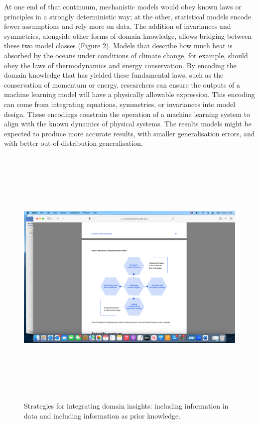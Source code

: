 At one end of that continuum, mechanistic models would obey known laws
or principles in a strongly deterministic way; at the other, statistical
models encode fewer assumptions and rely more on data. The addition of
invariances and symmetries, alongside other forms of domain knowledge,
allows bridging between these two model classes (Figure 2). Models that
describe how much heat is absorbed by the oceans under conditions of
climate change, for example, should obey the laws of thermodynamics and
energy conservation. By encoding the domain knowledge that has yielded
these fundamental laws, such as the conservation of momentum or energy,
researchers can ensure the outputs of a machine learning model will have
a physically allowable expression. This encoding can come from
integrating equations, symmetries, or invariances into model design.
These encodings constrain the operation of a machine learning system to
align with the known dynamics of physical systems. The results models
might be expected to produce more accurate results, with smaller
generalisation errors, and with better out-of-distribution
generalisation.

\begin{figure}
\includegraphics[width=5.52778in,height=5.10021in]{media/image2.png}
\caption{Strategies for integrating domain insights: including information in data and including information as prior knowledge.}
\end{figure}

